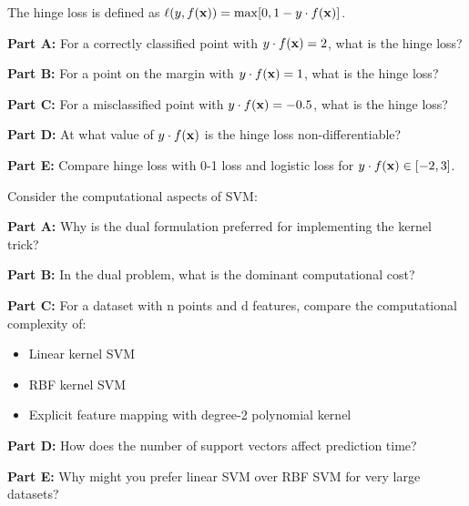 \documentclass{article}
\newcounter{exercise}
\begin{document}
\begin{tcolorbox}[colback=blue!5!white,colframe=blue!75!black,title=Exercise \theexercise: Hinge Loss Analysis]
The hinge loss is defined as $\ell(y, f(\mathbf{x})) = \max[0, 1 - y \cdot f(\mathbf{x})]$.

\textbf{Part A:} For a correctly classified point with $y \cdot f(\mathbf{x}) = 2$, what is the hinge loss?

\textbf{Part B:} For a point on the margin with $y \cdot f(\mathbf{x}) = 1$, what is the hinge loss?

\textbf{Part C:} For a misclassified point with $y \cdot f(\mathbf{x}) = -0.5$, what is the hinge loss?

\textbf{Part D:} At what value of $y \cdot f(\mathbf{x})$ is the hinge loss non-differentiable?

\textbf{Part E:} Compare hinge loss with 0-1 loss and logistic loss for $y \cdot f(\mathbf{x}) \in [-2, 3]$.
\end{tcolorbox}

\begin{tcolorbox}[colback=blue!5!white,colframe=blue!75!black,title=Exercise \theexercise: Computational Complexity]
Consider the computational aspects of SVM:

\textbf{Part A:} Why is the dual formulation preferred for implementing the kernel trick?

\textbf{Part B:} In the dual problem, what is the dominant computational cost?

\textbf{Part C:} For a dataset with n points and d features, compare the computational complexity of:
\begin{itemize}
    \item Linear kernel SVM
    \item RBF kernel SVM
    \item Explicit feature mapping with degree-2 polynomial kernel
\end{itemize}

\textbf{Part D:} How does the number of support vectors affect prediction time?

\textbf{Part E:} Why might you prefer linear SVM over RBF SVM for very large datasets?
\end{tcolorbox}
\end{document}
